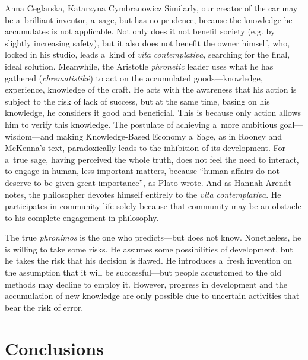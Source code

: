 \begin{artengenv2auth}{Anna Ceglarska, Katarzyna Cymbranowicz}
Similarly, our creator of the car may be a~brilliant inventor, a~sage, but has no prudence, because the knowledge he accumulates is not applicable. Not only does it not benefit society (e.g. by slightly increasing safety), but it also does not benefit the owner himself, who, locked in his studio, leads a~kind of \textit{vita} \textit{contemplativa}, searching for the final, ideal solution. Meanwhile, the Aristotle \textit{phronetic} leader uses what he has gathered (\textit{chrematistiké}) to act on the accumulated goods---knowledge, experience, knowledge of the craft. He acts with the awareness that his action is subject to the risk of lack of success, but at the same time, basing on his knowledge, he considers it good and beneficial. This is because only action allows him to verify this knowledge. The postulate of achieving a~more ambitious goal---wisdom---and making Knowledge-Based Economy a~Sage, as in Rooney and McKenna's text, paradoxically leads to the inhibition of its development. For a~true sage, having perceived the whole truth, does not feel the need to interact, to engage in human, less important matters, because ``human affairs do not deserve to be given great importance'', as Plato 
\parencite[][ {803b}]{plato_plato_1967-1} %
 wrote. And as Hannah Arendt 
\parencite*[][p.32]{arendt_promise_2005} %
 notes, the philosopher devotes himself entirely to the \textit{vita contemplativa}. He participates in community life solely because that community may be an obstacle to his complete engagement in philosophy.



The true \textit{phronimos} is the one who predicts---but does not know. Nonetheless, he is willing to take some risks. He assumes some possibilities of development, but he takes the risk that his decision is flawed. He introduces a~fresh invention on the assumption that it will be successful---but people accustomed to the old methods may decline to employ it. However, progress in development and the accumulation of new knowledge are only possible due to uncertain activities that bear the risk of error.



\section{Conclusions}


\end{artengenv2auth}
